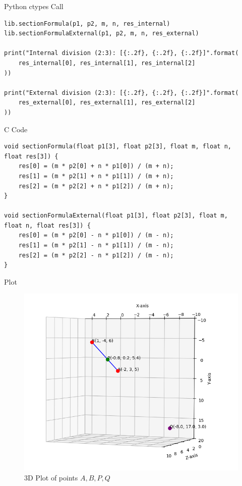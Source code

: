 \documentclass{beamer}
\begin{document}
\begin{frame}[fragile]{Python ctypes Call}
\begin{verbatim}
lib.sectionFormula(p1, p2, m, n, res_internal)
lib.sectionFormulaExternal(p1, p2, m, n, res_external)

print("Internal division (2:3): [{:.2f}, {:.2f}, {:.2f}]".format(
    res_internal[0], res_internal[1], res_internal[2]
))

print("External division (2:3): [{:.2f}, {:.2f}, {:.2f}]".format(
    res_external[0], res_external[1], res_external[2]
))
\end{verbatim}
\end{frame}
\begin{frame}[fragile]{C Code}
\begin{verbatim}
void sectionFormula(float p1[3], float p2[3], float m, float n,
float res[3]) {
    res[0] = (m * p2[0] + n * p1[0]) / (m + n);
    res[1] = (m * p2[1] + n * p1[1]) / (m + n);
    res[2] = (m * p2[2] + n * p1[2]) / (m + n);
}

void sectionFormulaExternal(float p1[3], float p2[3], float m, 
float n, float res[3]) {
    res[0] = (m * p2[0] - n * p1[0]) / (m - n);
    res[1] = (m * p2[1] - n * p1[1]) / (m - n);
    res[2] = (m * p2[2] - n * p1[2]) / (m - n);
}
\end{verbatim}
\end{frame}

\begin{frame}{Plot}
\begin{figure}
\centering
\includegraphics[width=0.8\linewidth]{Figs/graph.png}
\caption{3D Plot of points \(A, B, P, Q\)}
\label{fig:graph}
\end{figure}
\end{frame}
\end{document}
